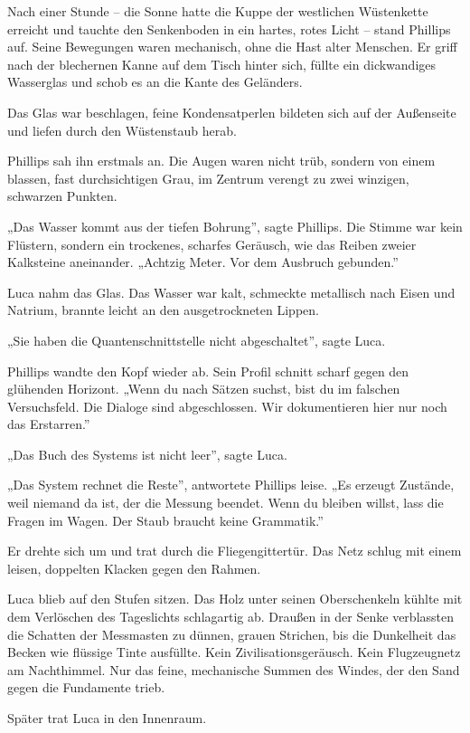 \documentclass[
  ngerman,
]{article}
\begin{document}
Nach einer Stunde -- die Sonne hatte die Kuppe der westlichen
Wüstenkette erreicht und tauchte den Senkenboden in ein hartes, rotes
Licht -- stand Phillips auf. Seine Bewegungen waren mechanisch, ohne die
Hast alter Menschen. Er griff nach der blechernen Kanne auf dem Tisch
hinter sich, füllte ein dickwandiges Wasserglas und schob es an die
Kante des Geländers.

Das Glas war beschlagen, feine Kondensatperlen bildeten sich auf der
Außenseite und liefen durch den Wüstenstaub herab.

Phillips sah ihn erstmals an. Die Augen waren nicht trüb, sondern von
einem blassen, fast durchsichtigen Grau, im Zentrum verengt zu zwei
winzigen, schwarzen Punkten.

„Das Wasser kommt aus der tiefen Bohrung'', sagte Phillips. Die Stimme
war kein Flüstern, sondern ein trockenes, scharfes Geräusch, wie das
Reiben zweier Kalksteine aneinander. „Achtzig Meter. Vor dem Ausbruch
gebunden.''

Luca nahm das Glas. Das Wasser war kalt, schmeckte metallisch nach Eisen
und Natrium, brannte leicht an den ausgetrockneten Lippen.

„Sie haben die Quantenschnittstelle nicht abgeschaltet'', sagte Luca.

Phillips wandte den Kopf wieder ab. Sein Profil schnitt scharf gegen den
glühenden Horizont. „Wenn du nach Sätzen suchst, bist du im falschen
Versuchsfeld. Die Dialoge sind abgeschlossen. Wir dokumentieren hier nur
noch das Erstarren.''

„Das Buch des Systems ist nicht leer'', sagte Luca.

„Das System rechnet die Reste'', antwortete Phillips leise. „Es erzeugt
Zustände, weil niemand da ist, der die Messung beendet. Wenn du bleiben
willst, lass die Fragen im Wagen. Der Staub braucht keine Grammatik.''

Er drehte sich um und trat durch die Fliegengittertür. Das Netz schlug
mit einem leisen, doppelten Klacken gegen den Rahmen.

Luca blieb auf den Stufen sitzen. Das Holz unter seinen Oberschenkeln
kühlte mit dem Verlöschen des Tageslichts schlagartig ab. Draußen in der
Senke verblassten die Schatten der Messmasten zu dünnen, grauen
Strichen, bis die Dunkelheit das Becken wie flüssige Tinte ausfüllte.
Kein Zivilisationsgeräusch. Kein Flugzeugnetz am Nachthimmel. Nur das
feine, mechanische Summen des Windes, der den Sand gegen die Fundamente
trieb.

Später trat Luca in den Innenraum.
\end{document}

